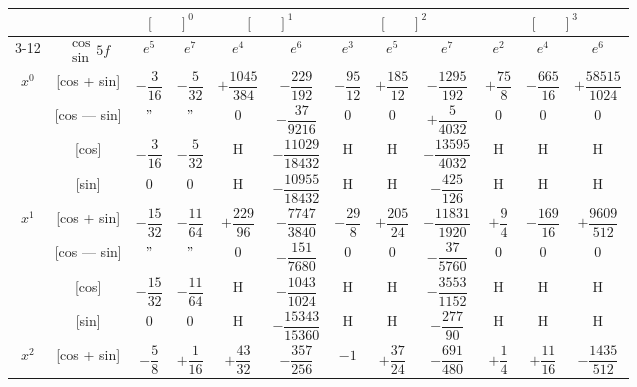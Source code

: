 \documentclass[11pt,a4paper]{book}
\begin{document}
{{\vspace{1em}

\newpage
{}

\begin{center}
\small
\begin{tabular}{|c|c|c|c|c|c|c|c|c|c|c|c|}
\hline
& & \multicolumn{2}{c|}{$[\phantom{()}]^0$} & \multicolumn{2}{c|}{$[\phantom{()}]^1$} & \multicolumn{3}{c|}{$[\phantom{()}]^2$} & \multicolumn{3}{c|}{$[\phantom{()}]^3$} \\
\cline{3-12}
& $\begin{smallmatrix} \cos \\ \sin \end{smallmatrix} 5f$ & $e^5$ & $e^7$ & $e^4$ & $e^6$ & $e^3$ & $e^5$ & $e^7$ & $e^2$ & $e^4$ & $e^6$ \\
\hline
\multirow{4}{*}{$x^0$} & [cos + sin] & $-\dfrac{3}{16}$ & $-\dfrac{5}{32}$ & $+\dfrac{1045}{384}$ & $-\dfrac{229}{192}$ & $-\dfrac{95}{12}$ & $+\dfrac{185}{12}$ & $-\dfrac{1295}{192}$ & $+\dfrac{75}{8}$ & $-\dfrac{665}{16}$ & $+\dfrac{58515}{1024}$ \\
& [cos --- sin] & $"$ & $"$ & $0$ & $-\dfrac{37}{9216}$ & $0$ & $0$ & $+\dfrac{5}{4032}$ & $0$ & $0$ & $0$ \\
& [cos] & $-\dfrac{3}{16}$ & $-\dfrac{5}{32}$ & H & $-\dfrac{11029}{18432}$ & H & H & $-\dfrac{13595}{4032}$ & H & H & H \\
& [sin] & $0$ & $0$ & H & $-\dfrac{10955}{18432}$ & H & H & $-\dfrac{425}{126}$ & H & H & H \\
\hline
\multirow{4}{*}{$x^1$} & [cos + sin] & $-\dfrac{15}{32}$ & $-\dfrac{11}{64}$ & $+\dfrac{229}{96}$ & $-\dfrac{7747}{3840}$ & $-\dfrac{29}{8}$ & $+\dfrac{205}{24}$ & $-\dfrac{11831}{1920}$ & $+\dfrac{9}{4}$ & $-\dfrac{169}{16}$ & $+\dfrac{9609}{512}$ \\
& [cos --- sin] & $"$ & $"$ & $0$ & $-\dfrac{151}{7680}$ & $0$ & $0$ & $-\dfrac{37}{5760}$ & $0$ & $0$ & $0$ \\
& [cos] & $-\dfrac{15}{32}$ & $-\dfrac{11}{64}$ & H & $-\dfrac{1043}{1024}$ & H & H & $-\dfrac{3553}{1152}$ & H & H & H \\
& [sin] & $0$ & $0$ & H & $-\dfrac{15343}{15360}$ & H & H & $-\dfrac{277}{90}$ & H & H & H \\
\hline
\multirow{4}{*}{$x^2$} & [cos + sin] & $-\dfrac{5}{8}$ & $+\dfrac{1}{16}$ & $+\dfrac{43}{32}$ & $-\dfrac{357}{256}$ & $-1$ & $+\dfrac{37}{24}$ & $-\dfrac{691}{480}$ & $+\dfrac{1}{4}$ & $+\dfrac{11}{16}$ & $-\dfrac{1435}{512}$ \\

\end{tabular}
\end{center}}}
\end{document}

